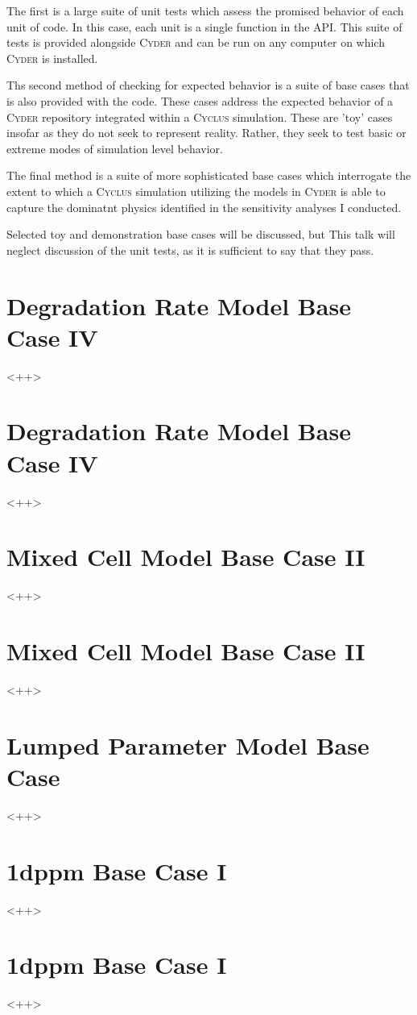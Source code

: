 \documentclass[letterpaper]{article}
\newcommand{\Cyder}{\textsc{Cyder}\xspace}
\newcommand{\Cyclus}{\textsc{Cyclus}\xspace}
\begin{document}
{The first is a large suite of unit tests which assess 
the promised behavior of each unit of code. In this case, each unit is a 
single function in the API. This suite of tests is provided 
alongside \Cyder and can be run on any computer on which \Cyder is installed. 

Ths second method of checking for expected behavior is a suite of base cases 
that is also provided with the code. These cases address the expected behavior 
of a \Cyder repository integrated within a \Cyclus simulation. These are 'toy' 
cases insofar as they do not seek to represent reality.  Rather, they seek to 
test basic or extreme modes of simulation level behavior.

The final method is a suite of more sophisticated base cases which interrogate 
the extent to which a \Cyclus simulation utilizing the models in \Cyder is able 
to capture the dominatnt physics identified in the sensitivity analyses I 
conducted.

Selected toy and demonstration base cases will be discussed, but  This talk will 
neglect discussion of the unit tests, as it is sufficient to say that they pass. 

\section{Degradation Rate Model Base Case IV}
<++>
\section{Degradation Rate Model Base Case IV}
<++>
\section{Mixed Cell Model Base Case  II}
<++>
\section{Mixed Cell Model Base Case  II}
<++>
\section{Lumped Parameter Model Base Case}
<++>
\section{1dppm Base Case I}
<++>
\section{1dppm Base Case I}
<++>

}
\end{document}
